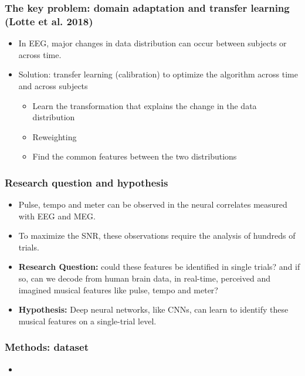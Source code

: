 \documentclass{beamer}
\begin{document}
\begin{frame}
	\frametitle{The key problem: domain adaptation and transfer learning (Lotte et al. 2018)}
	
	\begin{itemize}

		\item In EEG, major changes in data distribution can occur between subjects or across time.

		\item Solution: transfer learning (calibration) to optimize the algorithm across time and across subjects

		\begin{itemize}
			\item Learn the transformation that explains the change in the data distribution
			\item Reweighting
			\item Find the common features between the two distributions
		\end{itemize}

	\end{itemize}

\end{frame}



\begin{frame}
	\frametitle{Research question and hypothesis}
	
	\begin{itemize}

		\item Pulse, tempo and meter can be observed in the neural correlates measured with EEG and MEG.

		\item To maximize the SNR, these observations require the analysis of hundreds of trials.

		\item \textbf{Research Question:} could these features be identified in single trials? and if so, can we decode from human brain data, in real-time, perceived and imagined musical features like pulse, tempo and meter? 
			 
		\item \textbf{Hypothesis:} Deep neural networks, like CNNs, can learn to identify these musical features on a single-trial level.

	\end{itemize}

\end{frame}

\begin{frame}
	\frametitle{Methods: dataset}
	
	\begin{itemize}

		\item

	\end{itemize}

\end{frame}
\end{document}
